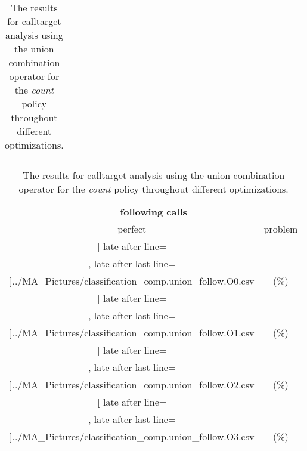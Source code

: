 \begin{table}[!htbp]
{\begin{tabular}{l|c|c|c}
    	\end{tabular}

	\begin{tabular}{|c|c}%

	\toprule
	\multicolumn{2}{c}{\bfseries following calls}\\
	
	perfect &  problem %
	\\\midrule
	\csvreader[ late after line=\\, late after last line=\\\midrule]{../MA_Pictures/classification_comp.union_follow.O0.csv}{
}
	{\csvcolxiii (\csvcolxiv \%) & \csvcolxv (\csvcolxvi \%)}%



\multicolumn{1}{c}{} 
	\\\midrule
	\csvreader[ late after line=\\, late after last line=\\\midrule]{../MA_Pictures/classification_comp.union_follow.O1.csv}{
}
	{\csvcolxiii (\csvcolxiv \%) & \csvcolxv (\csvcolxvi \%)}%
	
	
\multicolumn{1}{c}{}
	\\\midrule
	\csvreader[ late after line=\\, late after last line=\\\midrule]{../MA_Pictures/classification_comp.union_follow.O2.csv}{
}
	{\csvcolxiii (\csvcolxiv \%) & \csvcolxv (\csvcolxvi \%)}%
	

\multicolumn{1}{c}{}
	\\\midrule
	\csvreader[ late after line=\\, late after last line=\\\bottomrule]{../MA_Pictures/classification_comp.union_follow.O3.csv}{
}
	{\csvcolxiii (\csvcolxiv \%) & \csvcolxv (\csvcolxvi \%)}%


    	\end{tabular}
}
		\caption {The results for calltarget analysis using the union combination operator for the \textit{count} policy throughout different optimizations.}
		\label{tbl:CTunionCOUNT}
\end{table}

